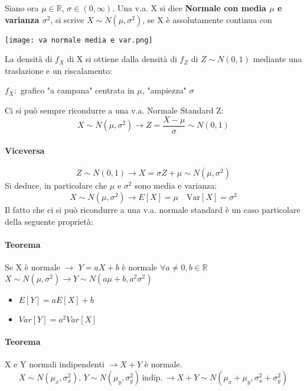 Siano ora $\mu \in \mathbb{R}$, $\sigma \in (0, \infty)$.
Una v.a. X si dice \textbf{Normale con media $\mu$ e varianza $\sigma^2$}, si scrive
\textbf{$X \sim N(\mu, \sigma^2)$}, se X è assolutamente continua con
\begin{center}
    \texttt{[image: va normale media e var.png]}
\end{center}
La densità di $f_X$ di X si ottiene dalla densità di $f_Z$ di $Z \sim N(0,1)$
mediante una traslazione e un riscalamento:
\begin{center}
    $f_X:$ grafico "a campana" centrata in $\mu$, "ampiezza" $\sigma$
\end{center}
Ci si può sempre ricondurre a una v.a. Normale Standard Z:
\begin{equation*}
    X \sim N(\mu, \sigma^2) \rightarrow Z = \frac{X-\mu}{\sigma} \sim N(0,1)
\end{equation*}
\paragraph*{Viceversa}
\begin{equation*}
    Z \sim N(0,1) \rightarrow X = \sigma Z + \mu \sim N(\mu, \sigma^2)
\end{equation*}
Si deduce, in particolare che $\mu$ e $\sigma^2$ sono media e varianza:
\begin{equation*}
    X \sim N(\mu, \sigma^2) \rightarrow E[X] = \mu \quad \text{Var}[X] = \sigma^2
\end{equation*}
Il fatto che ci si può ricondurre a una v.a. normale standard è un caso particolare
della seguente proprietà:
\paragraph*{Teorema} Se X è normale $\rightarrow$ $Y = aX+b$ è normale 
$\forall a \neq 0, b \in \mathbb{R}$
\\ $ X \sim N(\mu, \sigma^2) \rightarrow Y \sim N(a \mu+b, a^2 \sigma^2)$
\begin{itemize}
    \item $E[Y] = aE[X]+b$
    \item $Var[Y] = a^2 Var[X]$
\end{itemize}
\paragraph*{Teorema} X e Y normali indipendenti $\rightarrow X+Y$ è normale.
\begin{equation*}
    X \sim N(\mu_x, \sigma^{2}_x), \, Y \sim N(\mu_y, \sigma^{2}_y)\, \text{indip.}\,
    \rightarrow X+Y \sim N(\mu_x+\mu_y, \sigma^{2}_x + \sigma^{2}_y)
\end{equation*}
